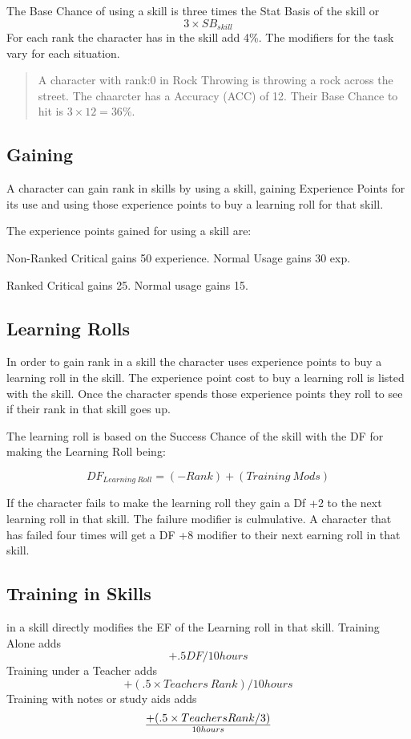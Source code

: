 The Base Chance of using a skill is three times the Stat Basis of the skill
or \[ 3 \times SB_{skill} \] For each rank the character has in the skill add 4\%.
The modifiers for the task vary for each situation.

\begin{quote}
A character with rank:0 in Rock Throwing is throwing a rock 
across the street. The chaarcter has a Accuracy (ACC) of 12. Their Base Chance 
to hit is \( 3 \times 12 = 36\% \).
\end{quote}

\subsection{Gaining}
A character can gain rank in skills by using a skill, gaining Experience Points
for its use and using those experience points to buy a learning roll for that
skill. 

The experience points gained for using a skill are:

\begin{relate}
	\item[Non-Ranked] Critical gains 50 experience. Normal Usage gains 30 exp.
	\item[Ranked] Critical gains 25. Normal usage gains 15.
\end{relate}

\subsection{Learning Rolls}

In order to gain rank in a skill the character uses experience points to
buy a learning roll in the skill. The experience point cost to buy a learning roll
is listed with the skill. Once the character spends
those experience points they roll to see if their rank in that
skill goes up.

The learning roll is based on the Success Chance of the skill with the  
DF for making the Learning Roll being: 

\[DF_{Learning\ Roll} = (-Rank) + ({Training\ Mods})\]

If the character fails to make the learning roll they gain a Df +2 to the next 
learning roll in that skill. The failure modifier is culmulative. A character
that has failed four times will get a DF +8 modifier to their next earning roll
in that skill.

\subsection{Training in Skills}

 in a skill directly modifies the EF of the Learning roll in
that skill. Training Alone adds \[+.5 DF/10 hours\] 
Training under a Teacher adds \[+(.5 \times {Teachers\ Rank})/10 hours\]
Training with notes or study aids adds \[+(.5 \times {Teachers Rank}/3) \over {10 hours}\]

